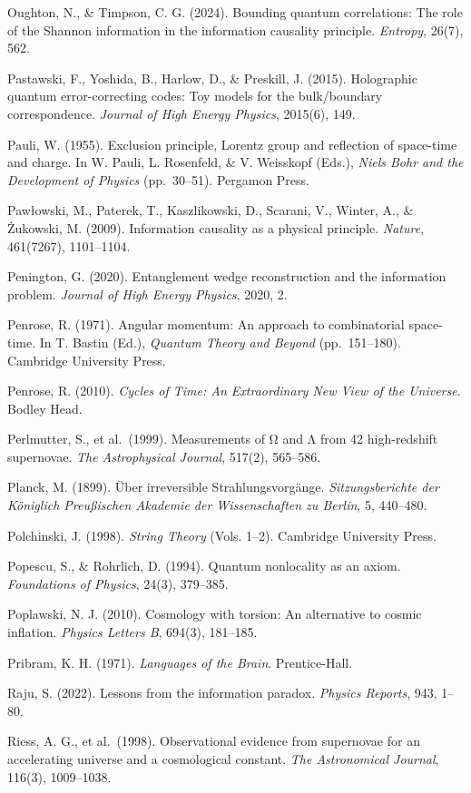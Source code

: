 \documentclass[
]{article}
\begin{document}
Oughton, N., \& Timpson, C. G. (2024). Bounding quantum correlations:
The role of the Shannon information in the information causality
principle. \emph{Entropy}, 26(7), 562.

Pastawski, F., Yoshida, B., Harlow, D., \& Preskill, J. (2015).
Holographic quantum error-correcting codes: Toy models for the
bulk/boundary correspondence. \emph{Journal of High Energy Physics},
2015(6), 149.

Pauli, W. (1955). Exclusion principle, Lorentz group and reflection of
space-time and charge. In W. Pauli, L. Rosenfeld, \& V. Weisskopf
(Eds.), \emph{Niels Bohr and the Development of Physics} (pp.~30--51).
Pergamon Press.

Pawłowski, M., Paterek, T., Kaszlikowski, D., Scarani, V., Winter, A.,
\& Żukowski, M. (2009). Information causality as a physical principle.
\emph{Nature}, 461(7267), 1101--1104.

Penington, G. (2020). Entanglement wedge reconstruction and the
information problem. \emph{Journal of High Energy Physics}, 2020, 2.

Penrose, R. (1971). Angular momentum: An approach to combinatorial
space-time. In T. Bastin (Ed.), \emph{Quantum Theory and Beyond}
(pp.~151--180). Cambridge University Press.

Penrose, R. (2010). \emph{Cycles of Time: An Extraordinary New View of
the Universe}. Bodley Head.

Perlmutter, S., et al.~(1999). Measurements of Ω and Λ from 42
high-redshift supernovae. \emph{The Astrophysical Journal}, 517(2),
565--586.

Planck, M. (1899). Über irreversible Strahlungsvorgänge.
\emph{Sitzungsberichte der Königlich Preußischen Akademie der
Wissenschaften zu Berlin}, 5, 440--480.

Polchinski, J. (1998). \emph{String Theory} (Vols. 1--2). Cambridge
University Press.

Popescu, S., \& Rohrlich, D. (1994). Quantum nonlocality as an axiom.
\emph{Foundations of Physics}, 24(3), 379--385.

Poplawski, N. J. (2010). Cosmology with torsion: An alternative to
cosmic inflation. \emph{Physics Letters B}, 694(3), 181--185.

Pribram, K. H. (1971). \emph{Languages of the Brain}. Prentice-Hall.

Raju, S. (2022). Lessons from the information paradox. \emph{Physics
Reports}, 943, 1--80.

Riess, A. G., et al.~(1998). Observational evidence from supernovae for
an accelerating universe and a cosmological constant. \emph{The
Astronomical Journal}, 116(3), 1009--1038.
\end{document}
